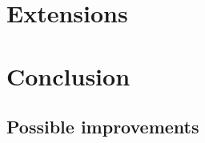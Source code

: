 \documentclass[a4paper, fleqn, 10pt]{book}
\theoremstyle{break}
\begin{document}


\chapter{Extensions}



\chapter{Conclusion}

\section{Possible improvements}




\end{document}
